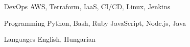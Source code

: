 

\begin{cvskills}

  \cvskill
    {DevOps} %
    {AWS, Terraform, IaaS, CI/CD, Linux, Jenkins}
    
  \cvskill
    {Programming} %
    {Python, Bash, Ruby JavaScript, Node.js, Java} %

  \cvskill
    {Languages} %
    {English, Hungarian} %

\end{cvskills}
